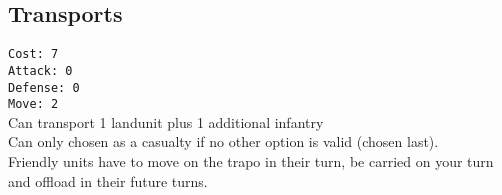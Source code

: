 \documentclass[10pt,a4paper,landscape]{article}
\begin{document}
\begin{multicols*}{3}
\subsection*{Transports}
\texttt{Cost: 7 \\ Attack: 0 \\ Defense: 0 \\ Move: 2}
\\
Can transport 1 landunit plus 1 additional infantry\\
Can only chosen as a casualty if no other option is valid (\glqq chosen last\grqq).\\
Friendly units have to move on the trapo in their turn, be carried on your turn and offload in their future turns.

\end{multicols*}
\end{document}
